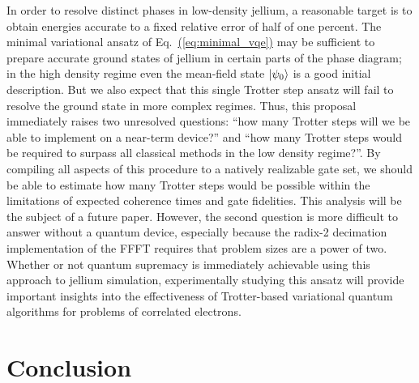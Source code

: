 \documentclass[superscriptaddress,aps,pra,nofootinbib,notitlepage,10pt,longbibliography]{revtex4-1}
\newcommand{\eq}[1]{Eq.~\hyperref[eq:#1]{(\ref*{eq:#1})}}
\def\ket#1{\mathinner{|{#1}\rangle}}
\begin{document}
In order to resolve distinct phases in low-density jellium, a reasonable target is to obtain energies accurate to a fixed relative error of half of one percent. The minimal variational ansatz of \eq{minimal_vqe} may be sufficient to prepare accurate ground states of jellium in certain parts of the phase diagram; in the high density regime even the mean-field state $\ket{\psi_0}$ is a good initial description. But we also expect that this single Trotter step ansatz will fail to resolve the ground state in more complex regimes. Thus, this proposal immediately raises two unresolved questions: ``how many Trotter steps will we be able to implement on a near-term device?'' and ``how many Trotter steps would be required to surpass all classical methods in the low density regime?''. By compiling all aspects of this procedure to a natively realizable gate set, we should be able to estimate how many Trotter steps would be possible within the limitations of expected coherence times and gate fidelities. This analysis will be the subject of a future paper. However, the second question is more difficult to answer without a quantum device, especially because the radix-2 decimation implementation of the FFFT requires that problem sizes are a power of two. Whether or not quantum supremacy is immediately achievable using this approach to jellium simulation, experimentally studying this ansatz will provide important insights into the effectiveness of Trotter-based variational quantum algorithms for problems of correlated electrons.


\section*{Conclusion}
\end{document}
